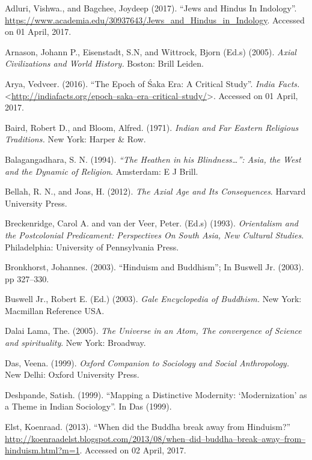 \begin{thebibliography}{99}
\itemsep=1pt
 Adluri, Vishwa., and Bagchee, Joydeep (2017). “Jews and Hindus In Indology”. \url{https://www.academia.edu/30937643/Jews_and_Hindus_in_Indology}. Accessed on 01 April, 2017.

  Arnason, Johann P., Eisenstadt, S.N, and Wittrock, Bjorn (Ed.s) (2005). \textit{Axial Civilizations and World History.} Boston: Brill Leiden.

  Arya, Vedveer. (2016). “The Epoch of Śaka Era: A Critical Study”. \textit{India Facts.} \textless \url{http://indiafacts.org/epoch–saka–era–critical–study/}\textgreater . Accessed on 01 April, 2017.

  Baird, Robert D., and Bloom, Alfred. (1971). \textit{Indian and Far Eastern Religious Traditions.} New York: Harper \& Row.

  Balagangadhara, S. N. (1994). \textit{“The Heathen in his Blindness…”: Asia, the West and the Dynamic of Religion}. Amsterdam: E J Brill.

  Bellah, R. N., and Joas, H. (2012). \textit{The Axial Age and Its Consequences}. Harvard University Press.

  Breckenridge, Carol A. and van der Veer, Peter. (Ed.s) (1993). \textit{Orientalism and the Postcolonial Predicament: Perspectives On South Asia, New Cultural Studies}. Philadelphia: University of Pennsylvania Press.

  Bronkhorst, Johannes. (2003). “Hinduism and Buddhism”; In Buswell Jr. (2003). pp 327–330.

  Buswell Jr., Robert E. (Ed.) (2003). \textit{Gale Encyclopedia of Buddhism.} New York: Macmillan Reference USA.

  Dalai Lama, The. (2005). \textit{The Universe in an Atom, The convergence of Science and spirituality}. New York: Broadway.

  Das, Veena. (1999). \textit{Oxford Companion to Sociology and Social Anthropology.} New Delhi: Oxford University Press.

  Deshpande, Satish. (1999). “Mapping a Distinctive Modernity: ‘Modernization’ as a Theme in Indian Sociology”. In Das (1999).

  Elst, Koenraad. (2013). “When did the Buddha break away from Hinduism?” \url{http://koenraadelst.blogspot.com/2013/08/when–did–buddha–break–away–from–hinduism.html?m=1}. Accessed on 02 April, 2017.


\end{thebibliography}
